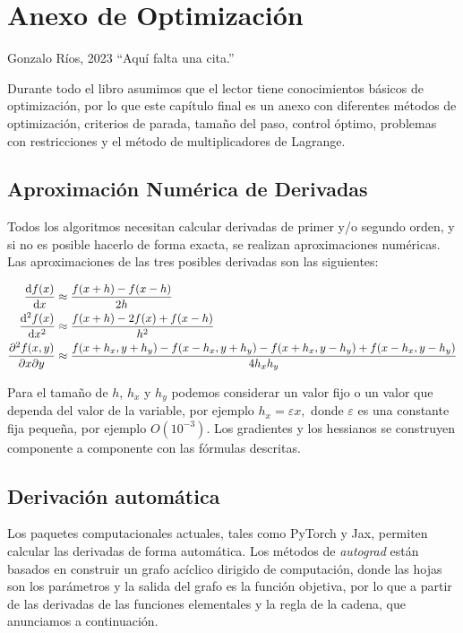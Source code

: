 \chapter{Anexo de Optimización}

\begin{chapquote}{Gonzalo Ríos, 2023}
	``Aquí falta una cita.''
\end{chapquote}

Durante todo el libro asumimos que el lector tiene conocimientos básicos de optimización, por lo que este capítulo final es un anexo con diferentes métodos de optimización, criterios de parada, tamaño del paso, control óptimo, problemas con restricciones y el método de multiplicadores de Lagrange.

\section{Aproximación Numérica de Derivadas}

Todos los algoritmos necesitan calcular derivadas de primer y/o segundo orden, y si no es posible hacerlo de forma exacta, se realizan aproximaciones numéricas. Las aproximaciones de las tres posibles derivadas son las siguientes:

\begin{align*}
\dv{f(x)}{x}		& \approx \frac{f(x+h) - f(x-h)}{2h} \\
\dv[2]{f(x)}{x}		& \approx \frac{f(x+h) - 2f(x) + f(x-h)}{h^2} \\
\pdv{f(x, y)}{x}{y}	& \approx \frac{f(x+h_x, y+h_y) - f(x-h_x, y+h_y) - f(x+h_x, y-h_y) + f(x-h_x, y-h_y)}{4 h_{x} h_{y}}
\end{align*}

Para el tamaño de \(h\), \(h_x\) y \(h_y\) podemos considerar un valor fijo o un valor que dependa del valor de la variable, por ejemplo \(h_x = \varepsilon x,\) donde \(\varepsilon\) es una constante fija pequeña, por ejemplo \(O(10^{-3})\). Los gradientes y los hessianos se construyen componente a componente con las fórmulas descritas.

\section{Derivación automática}

Los paquetes computacionales actuales, tales como PyTorch y Jax, permiten calcular las derivadas de forma automática. Los métodos de \emph{autograd} están basados en construir un grafo acíclico dirigido de computación, donde las hojas son los parámetros y la salida del grafo es la función objetiva, por lo que a partir de las derivadas de las funciones elementales y la regla de la cadena, que anunciamos a continuación.

